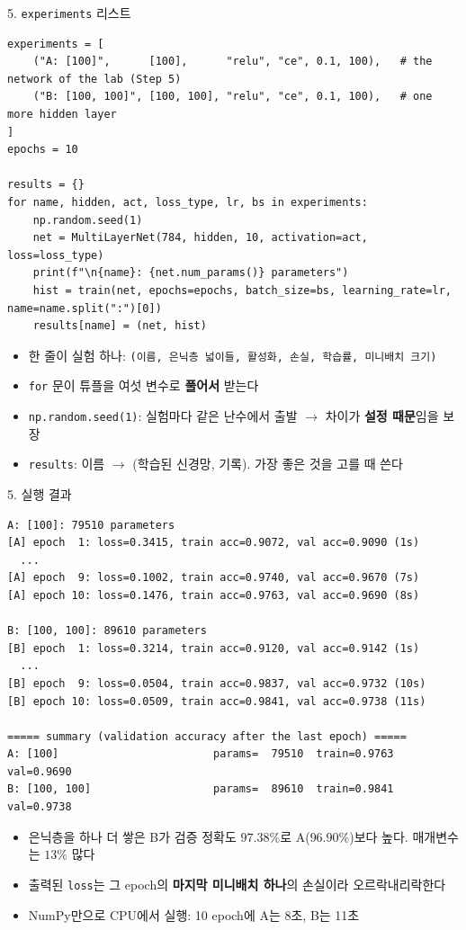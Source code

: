 \documentclass[aspectratio=169,11pt]{beamer}
\newcommand{\code}[1]{\texttt{#1}}
\begin{document}
\begin{frame}[fragile]{5. \code{experiments} 리스트}
\begin{lstlisting}[basicstyle=\ttfamily\fontsize{7.5}{8.4}\selectfont]
experiments = [
    ("A: [100]",      [100],      "relu", "ce", 0.1, 100),   # the network of the lab (Step 5)
    ("B: [100, 100]", [100, 100], "relu", "ce", 0.1, 100),   # one more hidden layer
]
epochs = 10

results = {}
for name, hidden, act, loss_type, lr, bs in experiments:
    np.random.seed(1)
    net = MultiLayerNet(784, hidden, 10, activation=act, loss=loss_type)
    print(f"\n{name}: {net.num_params()} parameters")
    hist = train(net, epochs=epochs, batch_size=bs, learning_rate=lr, name=name.split(":")[0])
    results[name] = (net, hist)
\end{lstlisting}
\small
\begin{itemize}
\item 한 줄이 실험 하나: \code{(이름, 은닉층 넓이들, 활성화, 손실, 학습률, 미니배치 크기)}
\item \code{for} 문이 튜플을 여섯 변수로 \textbf{풀어서} 받는다
\item \code{np.random.seed(1)}: 실험마다 같은 난수에서 출발 $\to$ 차이가 \textbf{설정 때문}임을 보장
\item \code{results}: 이름 $\to$ (학습된 신경망, 기록). 가장 좋은 것을 고를 때 쓴다
\end{itemize}
\end{frame}

\begin{frame}[fragile]{5. 실행 결과}
\begin{lstlisting}[style=outstyle,basicstyle=\ttfamily\fontsize{7.2}{8.0}\selectfont]
A: [100]: 79510 parameters
[A] epoch  1: loss=0.3415, train acc=0.9072, val acc=0.9090 (1s)
  ...
[A] epoch  9: loss=0.1002, train acc=0.9740, val acc=0.9670 (7s)
[A] epoch 10: loss=0.1476, train acc=0.9763, val acc=0.9690 (8s)

B: [100, 100]: 89610 parameters
[B] epoch  1: loss=0.3214, train acc=0.9120, val acc=0.9142 (1s)
  ...
[B] epoch  9: loss=0.0504, train acc=0.9837, val acc=0.9732 (10s)
[B] epoch 10: loss=0.0509, train acc=0.9841, val acc=0.9738 (11s)

===== summary (validation accuracy after the last epoch) =====
A: [100]                        params=  79510  train=0.9763  val=0.9690
B: [100, 100]                   params=  89610  train=0.9841  val=0.9738
\end{lstlisting}
\small
\begin{itemize}
\item 은닉층을 하나 더 쌓은 B가 검증 정확도 $97.38\%$로 A($96.90\%$)보다 높다. 매개변수는 $13\%$ 많다
\item 출력된 \code{loss}는 그 epoch의 \textbf{마지막 미니배치 하나}의 손실이라 오르락내리락한다
\item NumPy만으로 CPU에서 실행: 10 epoch에 A는 8초, B는 11초
\end{itemize}
\end{frame}
\end{document}
